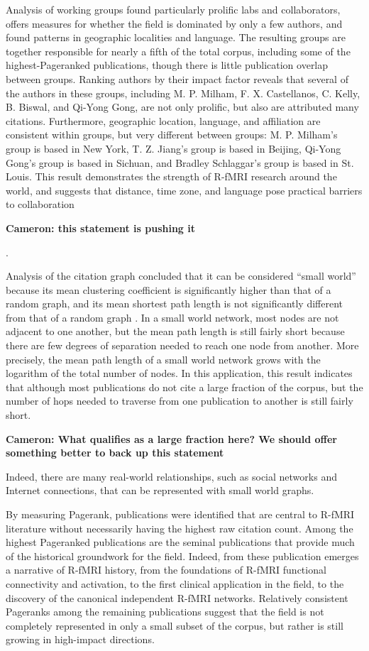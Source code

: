 \documentclass[5p]{elsarticle}
\newcommand\MyCBox[1]{%
  \colorbox{yellow!60}{\begin{varwidth}{\dimexpr\linewidth-2\fboxsep}#1\end{varwidth}}}
\newcommand{\COMMENTCC}[1]{\MyCBox{\textcolor{cc_commentcolor}{\textbf{Cameron:
#1}}}}
\begin{document}
Analysis of working groups found particularly prolific labs and
collaborators, offers measures for whether the field is dominated by only
a few authors, and found patterns in geographic localities and language.
The resulting groups are together responsible for nearly a fifth of the
total corpus, including some of the highest-Pageranked publications,
though there is little publication overlap between groups. Ranking authors
by their impact factor reveals that several of the authors in these
groups, including M. P. Milham, F. X. Castellanos, C.  Kelly, B. Biswal,
and Qi-Yong Gong, are not only prolific, but also are attributed many
citations. Furthermore, geographic location, language, and affiliation are
consistent within groups, but very different between groups: M. P.
Milham’s group is based in New York, T. Z. Jiang’s group is based in
Beijing, Qi-Yong Gong’s group is based in Sichuan, and Bradley Schlaggar’s
group is based in St. Louis.  This result demonstrates the strength of
R-fMRI research around the world, and suggests that distance, time zone,
and language pose practical barriers to collaboration \COMMENTCC{this
statement is pushing it}.

Analysis of the citation graph concluded that it can be considered ``small
world'' because its mean clustering coefficient is significantly higher
than that of a random graph, and its mean shortest path length is not
significantly different from that of a random graph \cite{Watts1998}. In a
small world network, most nodes are not adjacent to one another, but the
mean path length is still fairly short because there are few degrees of
separation needed to reach one node from another. More precisely, the mean
path length of a small world network grows with the logarithm of the total
number of nodes. In this application, this result indicates that although
most publications do not cite a large fraction of the corpus, but the
number of hops needed to traverse from one publication to another is still
fairly short. \COMMENTCC{What qualifies as a large fraction here? We
should offer something better to back up this statement} Indeed, there are
many real-world relationships, such as social networks and Internet
connections, that can be represented with small world graphs. 

By measuring Pagerank, publications were identified that are central to
R-fMRI literature without necessarily having the highest raw citation
count. Among the highest Pageranked publications are the seminal
publications that provide much of the historical groundwork for the field.
Indeed, from these publication emerges a narrative of R-fMRI history, from
the foundations of R-fMRI functional connectivity and activation, to the
first clinical application in the field, to the discovery of the canonical
independent R-fMRI networks.  Relatively consistent Pageranks among the
remaining publications suggest that the field is not completely
represented in only a small subset of the corpus, but rather is still
growing in high-impact directions. 
\end{document}
